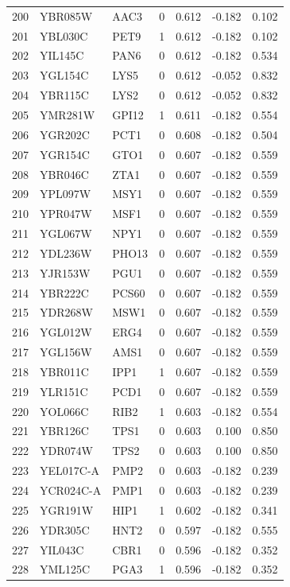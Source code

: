 \begin{longtable}{rllrrrr}
200 & YBR085W & AAC3 & 0 & 0.612 & -0.182 & 0.102\\
201 & YBL030C & PET9 & 1 & 0.612 & -0.182 & 0.102\\
202 & YIL145C & PAN6 & 0 & 0.612 & -0.182 & 0.534\\
203 & YGL154C & LYS5 & 0 & 0.612 & -0.052 & 0.832\\
204 & YBR115C & LYS2 & 0 & 0.612 & -0.052 & 0.832\\
205 & YMR281W & GPI12 & 1 & 0.611 & -0.182 & 0.554\\
206 & YGR202C & PCT1 & 0 & 0.608 & -0.182 & 0.504\\
207 & YGR154C & GTO1 & 0 & 0.607 & -0.182 & 0.559\\
208 & YBR046C & ZTA1 & 0 & 0.607 & -0.182 & 0.559\\
209 & YPL097W & MSY1 & 0 & 0.607 & -0.182 & 0.559\\
210 & YPR047W & MSF1 & 0 & 0.607 & -0.182 & 0.559\\
211 & YGL067W & NPY1 & 0 & 0.607 & -0.182 & 0.559\\
212 & YDL236W & PHO13 & 0 & 0.607 & -0.182 & 0.559\\
213 & YJR153W & PGU1 & 0 & 0.607 & -0.182 & 0.559\\
214 & YBR222C & PCS60 & 0 & 0.607 & -0.182 & 0.559\\
215 & YDR268W & MSW1 & 0 & 0.607 & -0.182 & 0.559\\
216 & YGL012W & ERG4 & 0 & 0.607 & -0.182 & 0.559\\
217 & YGL156W & AMS1 & 0 & 0.607 & -0.182 & 0.559\\
218 & YBR011C & IPP1 & 1 & 0.607 & -0.182 & 0.559\\
219 & YLR151C & PCD1 & 0 & 0.607 & -0.182 & 0.559\\
220 & YOL066C & RIB2 & 1 & 0.603 & -0.182 & 0.554\\
221 & YBR126C & TPS1 & 0 & 0.603 & 0.100 & 0.850\\
222 & YDR074W & TPS2 & 0 & 0.603 & 0.100 & 0.850\\
223 & YEL017C-A & PMP2 & 0 & 0.603 & -0.182 & 0.239\\
224 & YCR024C-A & PMP1 & 0 & 0.603 & -0.182 & 0.239\\
225 & YGR191W & HIP1 & 1 & 0.602 & -0.182 & 0.341\\
226 & YDR305C & HNT2 & 0 & 0.597 & -0.182 & 0.555\\
227 & YIL043C & CBR1 & 0 & 0.596 & -0.182 & 0.352\\
228 & YML125C & PGA3 & 1 & 0.596 & -0.182 & 0.352\\

\end{longtable}
